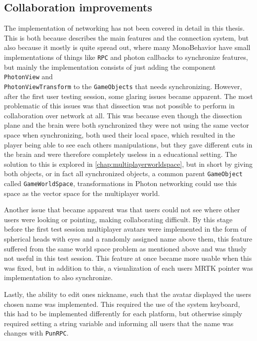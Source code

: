 \subsection{Collaboration improvements}

The implementation of networking has not been covered in detail in this thesis. This is both because  describes the main features and the connection system, but also because it mostly is quite spread out, where many MonoBehavior have small implementations of things like \texttt{RPC} and photon callbacks to synchronize features, but mainly the implementation consists of just adding the component \texttt{PhotonView} and \\\texttt{PhotonViewTransform} to the \texttt{GameObjects} that needs synchronizing. 
However, after the first user testing session, some glaring issues became apparent. The most problematic of this issues was that dissection was not possible to perform in collaboration over network at all. This was because even though the dissection plane and the brain were both synchronized they were not using the same vector space when synchronizing, both used their local space, which resulted in the player being able to see each others manipulations, but they gave different cuts in the brain and were therefore completely useless in a educational setting. The solution to this is explored in \autoref{chap:multiplayerworldspace}, but in short by giving both objects, or in fact all synchronized objects, a common parent \texttt{GameObject} called \texttt{GameWorldSpace}, transformations in Photon networking could use this space as the vector space for the multiplayer world. 


Another issue that became apparent was that users could not see where other users were looking or pointing, making collaborating difficult. By this stage before the first test session multiplayer avatars were implemented in the form of spherical heads with eyes and a randomly assigned name above them, this feature suffered from the same world space problem as mentioned above and was thusly not useful in this test session. This feature at once became more usable when this was fixed, but in addition to this, a visualization of each users MRTK pointer was implementation to also synchronize. 

Lastly, the ability to edit ones nickname, such that the avatar displayed the users chosen name was implemented. This required the use of the system keyboard, this had to be implemented differently for each platform, but otherwise simply required setting a string variable and informing all users that the name was changes with \texttt{PunRPC}.


